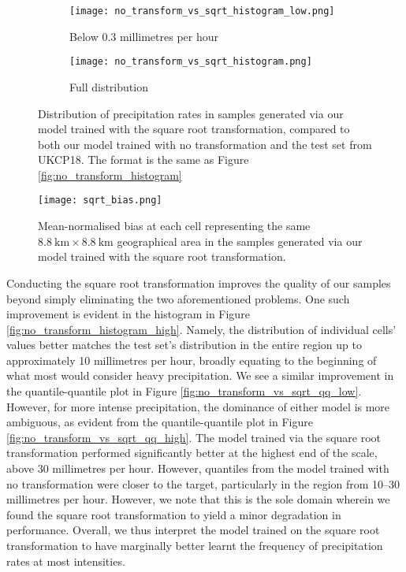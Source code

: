 \documentclass[ oneside,%
                    author={George Herbert},
                    degree={MSci},
                     title={Video Diffusion Models for Climate Simulations},
                  subtitle={}]{dissertation}
\begin{document}
\begin{figure}[htbp]
      \centering
      \begin{subfigure}{0.49\textwidth}
            \texttt{[image: no\_transform\_vs\_sqrt\_histogram\_low.png]}
            \caption{Below 0.3 millimetres per hour}
            \label{fig:no_transform_vs_sqrt_histogram_low}
      \end{subfigure}
      \begin{subfigure}{0.49\textwidth}
            \texttt{[image: no\_transform\_vs\_sqrt\_histogram.png]}
            \caption{Full distribution}
            \label{fig:no_transform_vs_sqrt_histogram_high}
      \end{subfigure}
      \caption{Distribution of precipitation rates in samples generated via our model trained with the square root transformation, compared to both our model trained with no transformation and the test set from UKCP18. The format is the same as Figure \ref{fig:no_transform_histogram}}
      \label{fig:no_transform_vs_sqrt_histogram}
\end{figure}

\begin{figure}[htbp]
      \centering
      \texttt{[image: sqrt\_bias.png]}
      \caption{Mean-normalised bias at each cell representing the same $8.8\ \mathrm{km}\times 8.8\ \mathrm{km}$ geographical area in the samples generated via our model trained with the square root transformation.}
      \label{fig:sqrt_bias}
\end{figure}

Conducting the square root transformation improves the quality of our samples beyond simply eliminating the two aforementioned problems. One such improvement is evident in the histogram in Figure \ref{fig:no_transform_histogram_high}. Namely, the distribution of individual cells' values better matches the test set's distribution in the entire region up to approximately 10 millimetres per hour, broadly equating to the beginning of what most would consider heavy precipitation. We see a similar improvement in the quantile-quantile plot in Figure \ref{fig:no_transform_vs_sqrt_qq_low}. However, for more intense precipitation, the dominance of either model is more ambiguous, as evident from the quantile-quantile plot in Figure \ref{fig:no_transform_vs_sqrt_qq_high}. The model trained via the square root transformation performed significantly better at the highest end of the scale, above 30 millimetres per hour. However, quantiles from the model trained with no transformation were closer to the target, particularly in the region from 10--30 millimetres per hour. However, we note that this is the sole domain wherein we found the square root transformation to yield a minor degradation in performance. Overall, we thus interpret the model trained on the square root transformation to have marginally better learnt the frequency of precipitation rates at most intensities.
\end{document}
